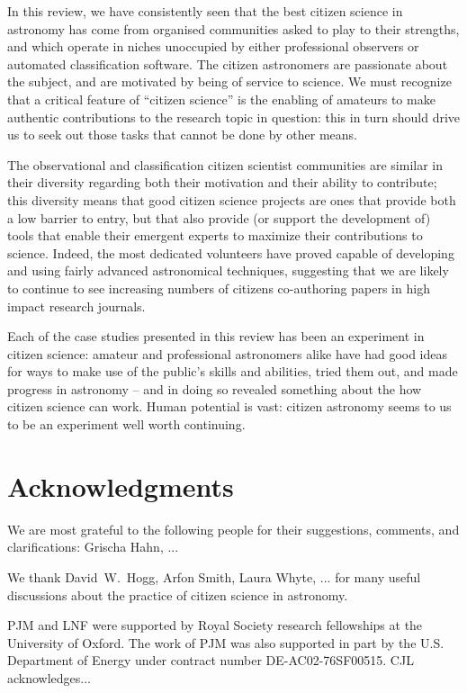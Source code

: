 \documentclass{ar2e}
\begin{document}
In this review, we have consistently seen that the best citizen science in
astronomy has come from organised communities asked to play to their strengths,
and which operate in niches unoccupied by either professional observers or
automated classification software. The citizen astronomers are passionate about
the subject, and are motivated by being of service to science. We must recognize
that a critical feature of ``citizen science'' is the enabling of amateurs to
make authentic contributions to the research topic in question: this in turn
should drive us to seek out those  tasks that cannot be done by other means. 

The observational and classification citizen scientist communities are similar
in their diversity regarding both their motivation and their ability to
contribute;  this diversity means that good citizen science projects are ones
that provide both a low barrier to entry, but that also provide (or support the
development of) tools that enable their emergent experts to maximize their
contributions to science.  Indeed, the most dedicated volunteers have proved
capable of developing and using fairly advanced astronomical techniques,
suggesting that we are likely to continue to see increasing numbers of citizens
co-authoring papers in high impact research journals.

Each of the case studies presented in this review has been an experiment in
citizen science: amateur and professional astronomers alike have had good ideas
for ways to make use of the public's skills and abilities, tried them out, and 
made progress in astronomy -- and in doing so revealed something about the how
citizen science can work. Human potential is vast: citizen astronomy seems to us
to be an experiment well worth continuing.



\section*{Acknowledgments}

We are most grateful to the following people for their suggestions, 
comments, and clarifications: Grischa Hahn, ... 

We thank David~W.~Hogg, Arfon Smith, Laura Whyte, ... for many useful
discussions about the practice of citizen science in astronomy.

PJM and LNF were supported by Royal Society research fellowships at the
University of Oxford. The work of PJM was also supported in part  by the U.S.
Department of Energy under contract number DE-AC02-76SF00515.
%
CJL acknowledges...
\end{document}
